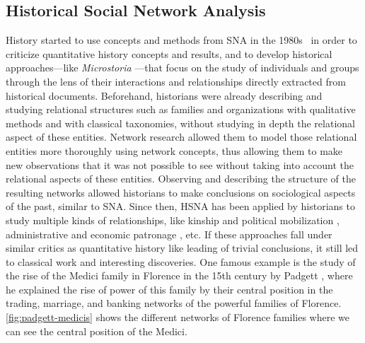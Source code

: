 \subsection{Historical Social Network Analysis}\label{subsec:historical-social-network-analsyis}

History started to use concepts and methods from SNA in the 1980s~\cite{wetherellHistoricalSocialNetwork1998} in order to criticize quantitative history concepts and results,
and to develop historical approaches---like \textit{Microstoria} \cite{ginzburgMicrohistoire1981}---that focus on the study of individuals and groups through the lens of their interactions and relationships directly extracted from historical documents.
Beforehand, historians were already describing and studying relational structures such as families and organizations with qualitative methods and with classical taxonomies, without studying in depth the relational aspect of these entities.
Network research allowed them to model those relational entities more thoroughly using network concepts, thus allowing them to make new observations that it was not possible to see without taking into account the relational aspects of these entities.
Observing and describing the structure of the resulting networks allowed historians to make conclusions on sociological aspects of the past, similar to SNA.
Since then, HSNA has been applied by historians to study multiple kinds of relationships, like kinship and political mobilization \cite{lippKinshipNetworksLocal2005}, administrative and economic patronage \cite{moutoukias1992}, etc.
If these approaches fall under similar critics as quantitative history \cite{lemercier12FormalNetwork2015} like leading of trivial conclusions, it still led to classical work and interesting discoveries.
One famous example is the study of the rise of the Medici family in Florence in the 15th century by Padgett \cite{padgettRobustActionRise1993}, where he explained the rise of power of this family by their central position in the trading, marriage, and banking networks of the powerful families of Florence. \autoref{fig:padgett-medicis} shows the different networks of Florence families where we can see the central position of the Medici.

